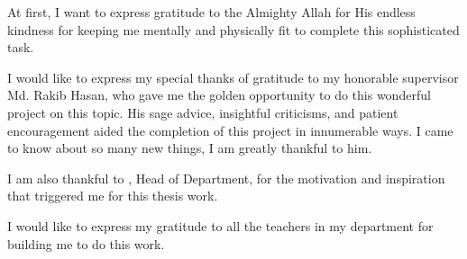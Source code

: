 \documentclass[12pt, a4paper, oneside]{Thesis} %
\title{\ttitle} %
\begin{document}
\frontmatter %


\fancyhead{} %
\rhead{\thepage} %
\lhead{} %

\pagestyle{fancy} %


\maketitle
\Certificate
%
\begin{abstract}
Vehicular mobility is a very important part of the network industry. As the world changed, every wired communication replaced by wireless communication. That's why VANET is very important. For being wireless it has lots of facilities. Also, have some drawbacks about the security issue. This type of network is affected by network attack like blackhole attack. Without taking steps against this issue the vanet is not reliable. A new blackhole attack detection technique is proposed which uses AODV as routing protocol. It detects the blackhole nodes and sends the information to the admin of the network. We also compare the blackhole attack with a flawless network.

\end{abstract}

\begin{acknowledgements}

At first, I want to express gratitude to the Almighty Allah for His endless kindness for keeping me mentally and physically fit to complete this sophisticated task.

I would like to express my special thanks of gratitude to my honorable supervisor   Md. Rakib Hasan, who gave me the golden opportunity to do this wonderful project on this topic. His sage advice, insightful criticisms, and patient encouragement aided the completion of this project in innumerable ways. I came to know about so many new things, I am greatly thankful to him.

I am also thankful to \cosupervisor, Head of Department, \cosupervisorinstitute for the motivation and inspiration that triggered me for this thesis work.

I would like to express my gratitude to all the teachers in my department for building me to do this work.


\end{acknowledgements}
\end{document}
